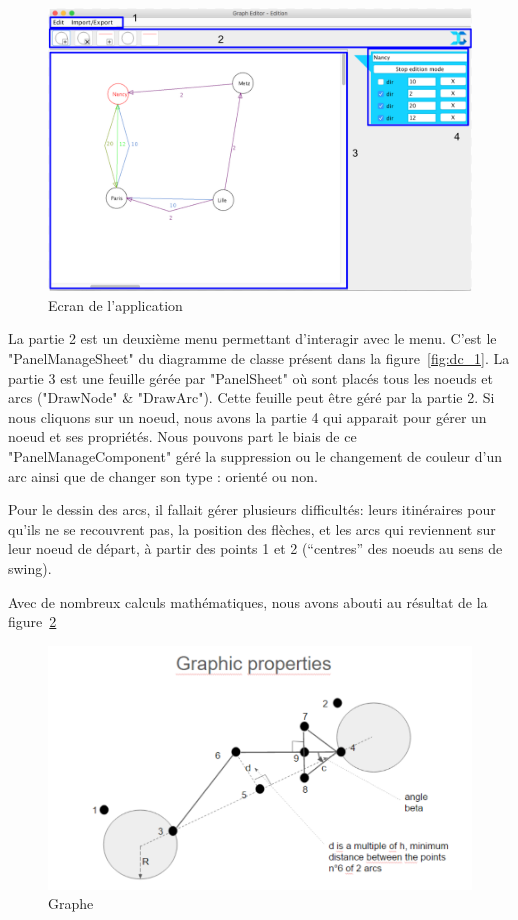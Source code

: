 \documentclass[pidr]{tnreport}
\begin{document}
\begin{figure}[h]
  \centering
  \includegraphics[width=17cm]{figures/programme_1}
  \caption{Ecran de l'application}
  \label{fig:programme_1}
\end{figure}

La partie 2 est un deuxième menu permettant d'interagir avec le menu. C'est le "PanelManageSheet" du diagramme de classe présent dans la figure~\ref{fig:dc_1}. La partie 3 est une feuille gérée par "PanelSheet" où sont placés tous les noeuds et arcs ("DrawNode" \& "DrawArc"). Cette feuille peut être géré par la partie 2. Si nous cliquons sur un noeud, nous avons la partie 4 qui apparait pour gérer un noeud et ses propriétés. Nous pouvons part le biais de ce "PanelManageComponent" géré la suppression ou le changement de couleur d'un arc ainsi que de changer son type : orienté ou non.

Pour le dessin des arcs, il fallait gérer plusieurs difficultés: leurs itinéraires pour qu’ils ne se recouvrent pas, la position des flèches, et les arcs qui reviennent sur leur noeud de départ, à partir des points 1 et 2 (“centres” des noeuds au sens de swing).

Avec de nombreux calculs mathématiques, nous avons abouti au résultat de la figure~\ref{fig:graphical_properties}

\begin{figure}[h]
  \centering
  \includegraphics[width=17cm]{figures/graphical_properties}
  \caption{Graphe}
  \label{fig:graphical_properties}
\end{figure}
\end{document}
